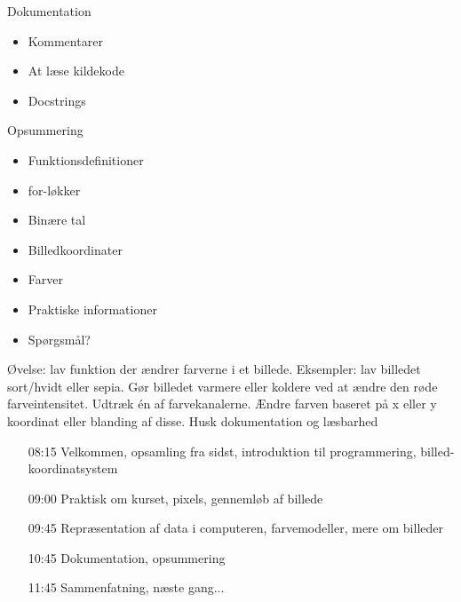 \documentclass[a4paper,landscape]{slides}
\begin{document}
\begin{slide}
	\begin{center} {\large 
            Dokumentation
	} \end{center}
	\begin{itemize} \addtolength{\itemsep}{-\baselineskip}
		\item Kommentarer
		\item At læse kildekode
		\item Docstrings
	\end{itemize}
\end{slide}

\begin{slide}
	\begin{center} {\large 
            Opsummering
	} \end{center}
	\begin{itemize} \addtolength{\itemsep}{-\baselineskip}
		\item Funktionsdefinitioner
		\item for-løkker
                \item Binære tal
		\item Billedkoordinater 
		\item Farver
		\item Praktiske informationer
		\item Spørgsmål?
	\end{itemize}
\end{slide}


\begin{slide}
	\begin{center} {\large 
            Øvelse: lav funktion der ændrer farverne i et billede. Eksempler: lav billedet sort/hvidt eller sepia. Gør billedet varmere eller koldere ved at ændre den røde farveintensitet. Udtræk én af farvekanalerne. Ændre farven baseret på x eller y koordinat eller blanding af disse. Husk dokumentation og læsbarhed
	} \end{center}
	\begin{itemize} \addtolength{\itemsep}{-\baselineskip}
    		\item[08:15] Velkommen, opsamling fra sidst, introduktion til programmering, billed-koordinatsystem
    		\item[09:00] Praktisk om kurset, pixels, gennemløb af billede
    		\item[09:45] Repræsentation af data i computeren, farvemodeller, mere om billeder
    		\item[10:45] Dokumentation, opsummering
    		\item[11:45] Sammenfatning, næste gang...
	\end{itemize}
\end{slide}
\end{document}
